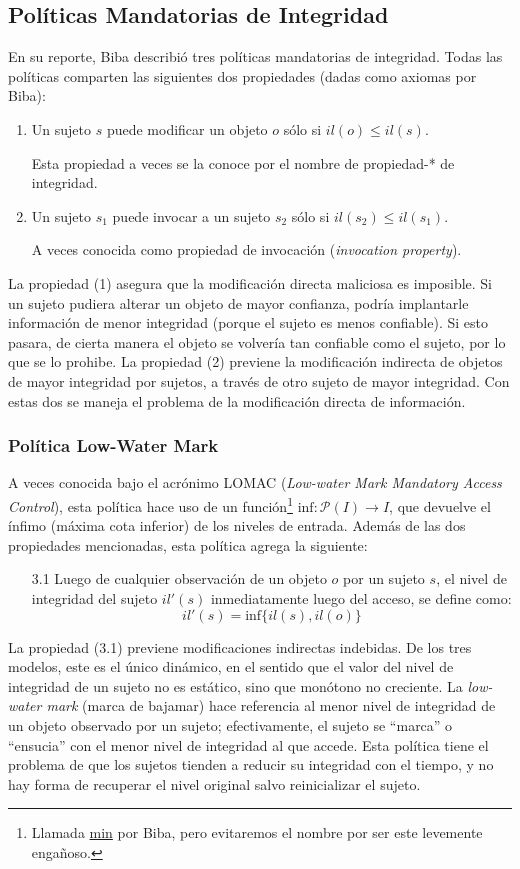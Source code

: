 \documentclass[spanish]{article}
\theoremstyle{definition}
\begin{document}
\subsection*{Políticas Mandatorias de Integridad}

En su reporte, Biba describió tres políticas mandatorias de integridad. Todas
las políticas comparten las siguientes dos propiedades (dadas como axiomas
por Biba):
\begin{enumerate}
  \item Un sujeto $s$ puede modificar un objeto $o$ sólo si $il(o) \leq il(s)$.

    Esta propiedad a veces se la conoce por el nombre de propiedad-* de
    integridad.

  \item Un sujeto $s_1$ puede invocar a un sujeto $s_2$ sólo si $il(s_2) \leq il(s_1)$.

    A veces conocida como propiedad de invocación (\textit{invocation property}).
\end{enumerate}
La propiedad (1) asegura que la modificación directa maliciosa es imposible. Si
un sujeto pudiera alterar un objeto de mayor confianza, podría implantarle
información de menor integridad (porque el sujeto es menos confiable). Si esto
pasara, de cierta manera el objeto se volvería tan confiable como el sujeto, por
lo que se lo prohibe.
La propiedad (2) previene la modificación indirecta de objetos de mayor integridad por
sujetos, a través de otro sujeto de mayor integridad. Con estas dos se maneja el
problema de la modificación directa de información.

\subsubsection*{Política Low-Water Mark}
A veces conocida bajo el acrónimo LOMAC (\textit{Low-water Mark Mandatory Access
Control}), esta política hace uso de un función\footnote{Llamada \underline{min}
por Biba, pero evitaremos el nombre por ser este levemente engañoso.}
$\text{inf}\colon \mathcal{P}(I) \to I$, que devuelve el ínfimo (máxima cota
inferior) de los niveles de entrada. Además de las dos propiedades mencionadas,
esta política agrega la siguiente:
\begin{itemize}
  \item[3.1] Luego de cualquier observación de un objeto $o$ por un sujeto $s$, el
    nivel de integridad del sujeto $il'(s)$ inmediatamente luego del acceso,
    se define como:
    \[ il'(s) = \text{inf}\{il(s), il(o)\} \]
  \end{itemize}
La propiedad (3.1) previene modificaciones indirectas indebidas.
De los tres modelos, este es el único dinámico, en el sentido que el valor del
nivel de integridad de un sujeto no es estático, sino que monótono no
creciente. La \textit{low-water mark} (marca de bajamar) hace referencia al
menor nivel de integridad de un objeto observado por un sujeto; efectivamente,
el sujeto se ``marca'' o ``ensucia'' con el menor nivel de integridad al que
accede. Esta política tiene el problema de que los sujetos tienden a reducir su
integridad con el tiempo, y no hay forma de recuperar el nivel original salvo
reinicializar el sujeto.
\end{document}
